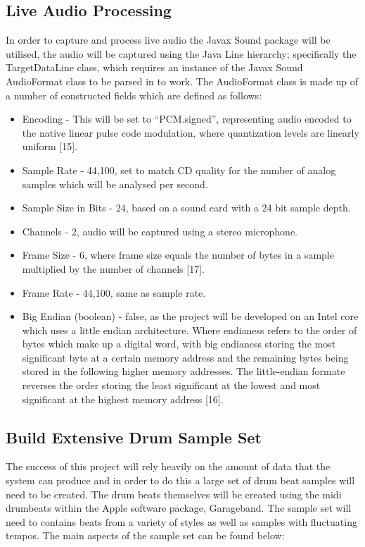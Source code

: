 \documentclass[a4paper, 11pt]{article}
\begin{document}
\subsection{Live Audio Processing}
In order to capture and process live audio the Javax Sound package will be utilised, the audio will be captured using the Java Line hierarchy; specifically the TargetDataLine class, which requires an instance of the Javax Sound AudioFormat class to be parsed in to work. The AudioFormat class is made up of a number of constructed fields which are defined as follows:

\begin{itemize}
\item Encoding - This will be set to ``PCM.signed'', representing audio encoded to the native linear pulse code modulation, where quantization levels are linearly uniform [15].
\item Sample Rate - 44,100, set to match CD quality for the number of analog samples which will be analysed per second. 
\item Sample Size in Bits - 24, based on a sound card with a 24 bit sample depth.
\item Channels - 2, audio will be captured using a stereo microphone.
\item Frame Size - 6, where frame size equals the number of bytes in a sample multiplied by the number of channels [17].
\item Frame Rate - 44,100, same as sample rate.
\item Big Endian (boolean) - false, as the project will be developed on an Intel core which uses a little endian architecture. Where endianess refers to the order of bytes which make up a digital word, with big endianess storing the most significant byte at a certain memory address and the remaining bytes being stored in the following higher memory addresses. The little-endian formate reverses the order storing the least significant at the lowest and most significant at the highest memory address [16].
\end{itemize}


\subsection{Build Extensive Drum Sample Set}
The success of this project will rely heavily on the amount of data that the system can produce and in order to do this a large set of drum beat samples will need to be created. The drum beats themselves will be created using the midi drumbeats within the Apple software package, Garageband. The sample set will need to contains beats from a variety of styles as well as samples with fluctuating tempos. The main aspects of the sample set can be found below:
\end{document}
